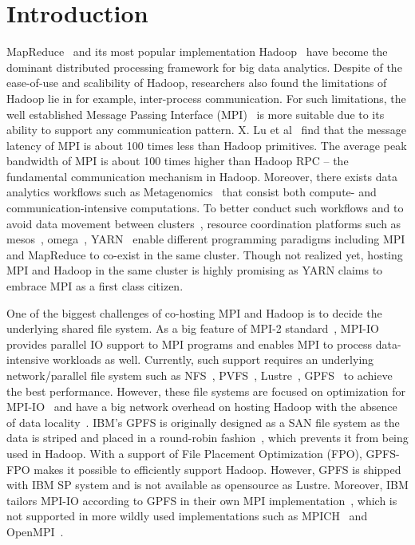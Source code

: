 \section{Introduction}
MapReduce~\cite{mr} and its most popular implementation Hadoop~\cite{hadoop}
have become the dominant distributed processing framework for big data
analytics. Despite of the ease-of-use and scalibility of Hadoop, researchers
also found the limitations of Hadoop lie in for example, inter-process
communication. For such limitations, the well established Message Passing
Interface (MPI)~\cite{mpi} is more suitable due to its ability to support any
communication pattern. X. Lu et al~\cite{xlu} find that  the
message latency of MPI is about 100 times less than Hadoop
primitives. The average peak bandwidth of MPI is about
100 times higher than Hadoop RPC -- the fundamental communication
mechanism in Hadoop. Moreover, there exists data analytics workflows such as
Metagenomics~\cite{meta} that consist both compute- and communication-intensive
computations. To better conduct such workflows and to avoid data
movement between clusters~\cite{???}, resource coordination platforms such as
mesos~\cite{mesos}, omega~\cite{omega}, YARN~\cite{yarn} enable different
programming paradigms including MPI and MapReduce to co-exist in the same
cluster. Though not realized yet, hosting MPI and Hadoop in the same cluster is
highly promising as YARN claims to embrace MPI as a first class citizen.

One of the biggest challenges of co-hosting MPI and Hadoop is to decide the
underlying shared file system. As a big feature of MPI-2 standard~\cite{mpi},
MPI-IO provides parallel IO support to MPI programs and enables MPI to process
data-intensive workloads as well. Currently, such support requires an underlying
network/parallel file system such as NFS~\cite{nfs1}, PVFS~\cite{pvfs},
Lustre~\cite{lustre}, GPFS~\cite{gpfs} to achieve the best performance. However,
these file systems are focused on optimization for MPI-IO~\cite{mpipvfs,
mpilustre1, mpigpfs} and have a big network overhead on hosting Hadoop with the
absence of data locality~\cite{hadooplustre}. IBM's GPFS is originally designed
as a SAN file system as the data is striped and placed in a round-robin
fashion~\cite{gpfs}, which prevents it from being used in Hadoop. With a support
of File Placement Optimization (FPO), GPFS-FPO makes it possible to efficiently
support Hadoop.  However, GPFS is shipped with IBM SP system and is not
available as opensource as Lustre. Moreover, IBM tailors MPI-IO according to
GPFS in their own MPI implementation~\cite{mpigpfs}, which is not supported in
more wildly used implementations such as MPICH~\cite{} and
OpenMPI~\cite{openmpi}.

